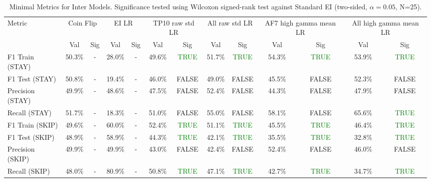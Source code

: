 \begin{table}[ht]
\centering
\begin{tabular}{lcccccccccccc}
\hline
Metric & \multicolumn{2}{c}{Coin Flip} & \multicolumn{2}{c}{EI LR} & \multicolumn{2}{c}{TP10 raw std LR} & \multicolumn{2}{c}{All raw std LR} & \multicolumn{2}{c}{AF7 high gamma mean LR} & \multicolumn{2}{c}{All high gamma mean LR} \\
 & Val & Sig & Val & Sig & Val & Sig & Val & Sig & Val & Sig & Val & Sig \\
\hline
F1 Train (STAY) & 50.3\% & - & 28.0\% & - & 49.6\% & \textcolor{green}{TRUE} & 51.7\% & \textcolor{green}{TRUE} & 54.3\% & \textcolor{green}{TRUE} & 53.9\% & \textcolor{green}{TRUE} \\
F1 Test (STAY) & 50.8\% & - & 19.4\% & - & 46.0\% & FALSE & 49.0\% & FALSE & 45.5\% & FALSE & 52.3\% & FALSE \\
Precision (STAY) & 49.9\% & - & 48.6\% & - & 47.5\% & FALSE & 52.4\% & FALSE & 44.3\% & FALSE & 47.9\% & FALSE \\
Recall (STAY) & 51.7\% & - & 18.3\% & - & 51.0\% & FALSE & 55.0\% & FALSE & 58.1\% & FALSE & 65.6\% & \textcolor{green}{TRUE} \\
F1 Train (SKIP) & 49.6\% & - & 60.0\% & - & 52.4\% & \textcolor{green}{TRUE} & 51.1\% & \textcolor{green}{TRUE} & 45.5\% & \textcolor{green}{TRUE} & 46.4\% & \textcolor{green}{TRUE} \\
F1 Test (SKIP) & 48.9\% & - & 58.9\% & - & 44.3\% & \textcolor{green}{TRUE} & 42.1\% & \textcolor{green}{TRUE} & 35.5\% & \textcolor{green}{TRUE} & 32.8\% & \textcolor{green}{TRUE} \\
Precision (SKIP) & 49.9\% & - & 49.9\% & - & 43.0\% & FALSE & 42.4\% & FALSE & 52.4\% & FALSE & 46.0\% & FALSE \\
Recall (SKIP) & 48.0\% & - & 80.9\% & - & 50.8\% & \textcolor{green}{TRUE} & 47.1\% & \textcolor{green}{TRUE} & 42.7\% & \textcolor{green}{TRUE} & 34.7\% & \textcolor{green}{TRUE} \\
\hline
\end{tabular}
\caption{Minimal Metrics for Inter Models. Significance tested using Wilcoxon signed-rank test against Standard EI (two-sided, $\alpha=0.05$, N=25).}
\label{tab:metrics_inter_ablation}
\end{table}